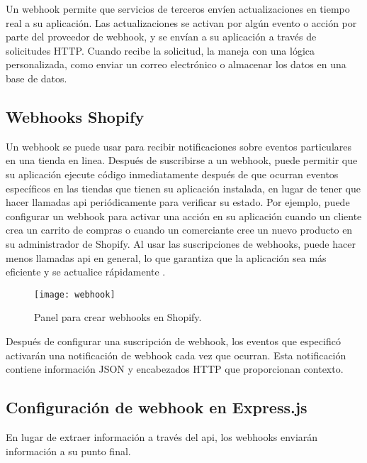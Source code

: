 Un webhook permite que servicios de terceros envíen actualizaciones en tiempo real a su aplicación. Las actualizaciones se activan por algún evento o acción por parte del proveedor de webhook, y se envían a su aplicación a través de solicitudes HTTP. Cuando recibe la solicitud, la maneja con una lógica personalizada, como enviar un correo electrónico o almacenar los datos en una base de datos.

\subsection{Webhooks Shopify}
Un webhook se puede usar para recibir notificaciones sobre eventos particulares en una tienda en linea. Después de suscribirse a un webhook, puede permitir que su aplicación ejecute código inmediatamente después de que ocurran eventos específicos en las tiendas que tienen su aplicación instalada, en lugar de tener que hacer llamadas \acrshort{api} periódicamente para verificar su estado. Por ejemplo, puede configurar un webhook para activar una acción en su aplicación cuando un cliente crea un carrito de compras o cuando un comerciante cree un nuevo producto en su administrador de Shopify. Al usar las suscripciones de webhooks, puede hacer menos llamadas \acrshort{api} en general, lo que garantiza que la aplicación sea más eficiente y se actualice rápidamente \cite{webhook}.
\vspace{0.8cm}

\begin{figure}[H]
  \centering
  \texttt{[image: webhook]}
  \caption{Panel para crear webhooks en Shopify.}
\end{figure}

Después de configurar una suscripción de webhook, los eventos que especificó activarán una notificación de webhook cada vez que ocurran. Esta notificación contiene información JSON y encabezados HTTP que proporcionan contexto.

\newpage
\subsection{Configuración de webhook en Express.js}
En lugar de extraer información a través del \acrshort{api}, los webhooks enviarán información a su punto final.
\vspace{0.8cm}

